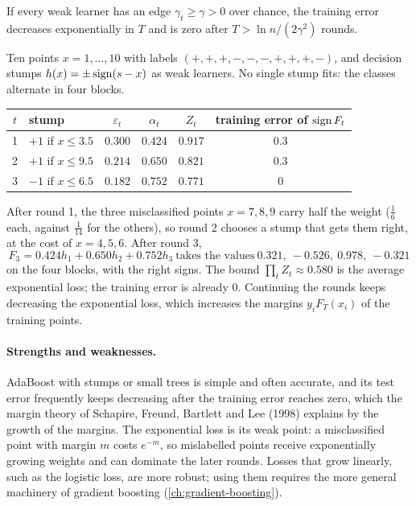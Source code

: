 \begin{notechapter}
If every weak learner has an edge $\gamma_t\geq\gamma>0$ over chance, the training error decreases
exponentially in $T$ and is zero after $T>\ln n/(2\gamma^2)$ rounds.

\begin{example}\label{ensemble-methods:ex:adaboost}
Ten points $x = 1,\dots,10$ with labels $(+, +, +, -, -, -, +, +, +, -)$, and decision stumps
$h(x) = \pm\operatorname{sign}(s - x)$ as weak learners. No single stump fits: the classes alternate in four
blocks.
\begin{center}
\begin{tabular}{@{}clcccc@{}}
\toprule
$t$ & stump & $\varepsilon_t$ & $\alpha_t$ & $Z_t$ & training error of $\operatorname{sign} F_t$ \\
\midrule
1 & $+1$ if $x\leq3.5$ & $0.300$ & $0.424$ & $0.917$ & $0.3$ \\
2 & $+1$ if $x\leq9.5$ & $0.214$ & $0.650$ & $0.821$ & $0.3$ \\
3 & $-1$ if $x\leq6.5$ & $0.182$ & $0.752$ & $0.771$ & $0$ \\
\bottomrule
\end{tabular}
\end{center}
After round 1, the three misclassified points $x = 7, 8, 9$ carry half the weight ($\frac16$ each,
against $\frac1{14}$ for the others), so round 2 chooses a stump that gets them right, at the
cost of $x = 4, 5, 6$. After round 3,
\[
  F_3 = 0.424h_1 + 0.650h_2 + 0.752h_3\ \text{takes the values}\ 0.321,\ -0.526,\ 0.978,\ -0.321
\]
on the four blocks, with the right signs. The bound $\prod_tZ_t\approx0.580$ is the average exponential
loss; the training error is already $0$. Continuing the rounds keeps decreasing the
exponential loss, which increases the margins $y_iF_T(x_i)$ of the training points.
\end{example}

\paragraph{Strengths and weaknesses.} AdaBoost with stumps or small trees is simple and
often accurate, and its test error frequently keeps decreasing after the training error
reaches zero, which the margin theory of Schapire, Freund, Bartlett and Lee (1998)
explains by the growth of the margins. The exponential loss is its weak point: a
misclassified point with margin $m$ costs $e^{-m}$, so mislabelled points receive exponentially
growing weights and can dominate the later rounds. Losses that grow linearly, such as
the logistic loss, are more robust; using them requires the more general machinery of
gradient boosting (\cref{ch:gradient-boosting}).


\end{notechapter}
